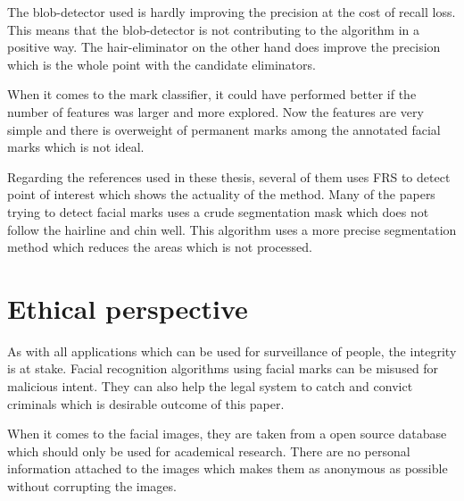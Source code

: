 The blob-detector used is hardly improving the precision at the cost of recall loss. This means that the blob-detector is not contributing to the algorithm in a positive way. The hair-eliminator on the other hand does improve the precision which is the whole point with the candidate eliminators.  

When it comes to the mark classifier, it could have performed better if the number of features was larger and more explored. Now the features are very simple and there is overweight of permanent marks among the annotated facial marks which is not ideal.

Regarding the references used in these thesis, several of them uses FRS to detect point of interest which shows the actuality of the method. Many of the papers trying to detect facial marks uses a crude segmentation mask which does not follow the hairline and chin well. This algorithm uses a more precise segmentation method which reduces the areas which is not processed. 


\section{Ethical perspective}

As with all applications which can be used for surveillance of people, the integrity is at stake. Facial recognition algorithms using facial marks can be misused for malicious intent. They can also help the legal system to catch and convict criminals which is desirable outcome of this paper. 

When it comes to the facial images, they are taken from a open source database which should only be used for academical research. There are no personal information attached to the images which makes them as anonymous as possible without corrupting the images.    